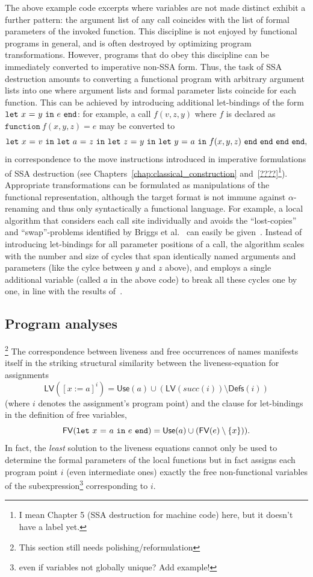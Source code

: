 The above example code excerpts where variables are not made distinct
exhibit a further pattern: the argument list of any call coincides
with the list of formal parameters of the invoked function. This
discipline is not enjoyed by functional programs in general, and is
often destroyed by optimizing program transformations. However,
programs that do obey this discipline can be immediately converted to
imperative non-SSA form. Thus, the task of SSA destruction amounts to
converting a functional program with arbitrary argument lists into one
where argument lists and formal parameter lists coincide for each
function. This can be achieved by introducing additional let-bindings
of the form $\mathtt{let}\ {x}\ \mathtt{=}\ {y}\ \mathtt{in}\ {e}\ \mathtt{end}$: for example, a call $f(v,z,y)$ where $f$
is declared as $\mathtt{function}\ f(x,y,z) = e$ may be converted to
$$\mathtt{let}\ {x}\ \mathtt{=}\ {v}\ \mathtt{in}\ {\mathtt{let}\ {a}\ \mathtt{=}\ {z}\ \mathtt{in}\ {\mathtt{let}\ {z}\ \mathtt{=}\ {y}\ \mathtt{in}\ {\mathtt{let}\ {y}\ \mathtt{=}\ {a}\ \mathtt{in}\ {f(x,y,z)}\ \mathtt{end}}\ \mathtt{end}}\ \mathtt{end}}\ \mathtt{end},$$ in
correspondence to the move instructions introduced in imperative
formulations of SSA destruction (see
Chapters~\ref{chap:classical_construction} and~\ref{????}\footnote{I
mean Chapter 5 (SSA destruction for machine code) here, but it doesn't
have a label yet.}). Appropriate transformations can be formulated as
manipulations of the functional representation, although the target
format is not immune against $\alpha$-renaming and thus only
syntactically a functional language. For example, a local algorithm
that considers each call site individually and avoids the
``lost-copies'' and ``swap''-problems identified by Briggs et
al.~\cite{DBLP:journals/spe/BriggsCHS98} can easily be
given~\cite{DBLP:journals/entcs/Beringer07}. Instead of introducing
let-bindings for all parameter positions of a call, the algorithm
scales with the number and size of cycles that span identically named
arguments and parameters (like the cylce between $y$ and $z$ above),
and employs a single additional variable (called $a$ in the above
code) to break all these cycles one by one, in line with the results
of~\cite{May}.

\subsection{Program analyses}
\label{section:Part1:Semantics:ProgramAnalyses}
\footnote{This section still needs polishing/reformulation}
The correspondence between liveness and free occurrences of names
manifests itself in the striking structural similarity between the
liveness-equation for assignments $$\mathsf{LV}([x:=a]^i) =
\mathsf{Use}(a) \cup (\mathsf{LV}(\mathit{succ}(i)) \setminus \mathsf{Defs}(i))$$ 
(where $i$ denotes the assignment's program point) and the clause for
let-bindings
in the definition of free variables,
$$\mathsf{FV}(\mathtt{let}\ {x}\ \mathtt{=}\ {a}\ \mathtt{in}\ {e}\ \mathtt{end}) = \mathsf{Use}(a) \cup (\mathsf{FV}(e) \setminus
\{x\})).
$$ In fact, the \emph{least} solution to the liveness equations cannot
only be used to determine the formal parameters of the local functions
but in fact assigns each program point $i$ (even intermediate ones)
exactly the free non-functional variables of the
subexpression\footnote{even if variables not globally unique? Add
example!}  corresponding to $i$.

